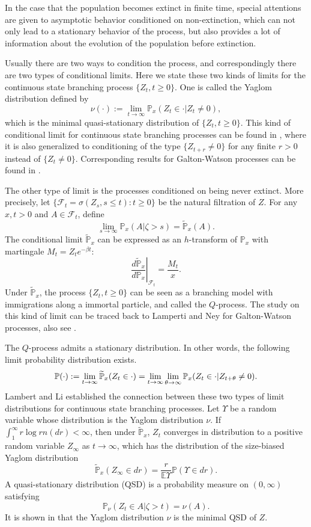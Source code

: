 \documentclass[12pt,a4paper]{amsart}
\numberwithin{equation}{section}
\theoremstyle{plain}
\theoremstyle{definition}
\theoremstyle{remark}
\begin{document}
In the case that the population becomes extinct in finite time, 
special attentions are given to asymptotic behavior conditioned on non-extinction, 
which can not only  lead to a stationary behavior
of the process, but also provides a lot of information about the evolution of the population before extinction.

Usually there are two ways to condition the process, and correspondingly there are two types of conditional limits. Here we state these two kinds of limits for  the continuous state branching process  $\{Z_t, t\geq 0\}$. One is called the Yaglom distribution defined by
\[
\nu(\cdot):=\lim_{t\to\infty} \mathbb P_x(Z_t\in\cdot|Z_{t}\neq 0),
\]
which is the minimal  quasi-stationary distribution of $\{Z_t, t\geq 0\}$. This kind of  conditional limit for continuous state branching processes  can be found in \cite{Li00}, where it is also generalized to conditioning of the type $\{Z_{t+r}\neq 0\}$ for any finite $r>0$ instead of $\{Z_{t}\neq 0\}$. Corresponding results for Galton-Watson processes can be found in \cite{AthreyaNey1972Branching}.

The other type of limit is the processes conditioned on being never extinct. More precisely,  let $\{\mathcal F_t=\sigma(Z_s,s\leq t): t\geq 0\}$ be the natural filtration of $Z$. 
For any $x,t>0$ and $A\in\mathcal F_t$, define
\[
	\lim_{s\rightarrow\infty}\mathbb P_x(A\big|\zeta>s)=\widetilde{\mathbb P}_x(A).
\]
The conditional limit $\widetilde{\mathbb P}_x$  can be expressed as an $h$-transform of $\mathbb P_x$ with martingale $M_t=Z_te^{-\beta t}$:
\[
	\left.\dfrac{d\widetilde{\mathbb P}_x}{d\mathbb P_x}\right|_{\mathcal F_t}=\dfrac{M_t}{x}.
\]
Under $\widetilde{\mathbb P}_x$, the process $\{Z_t, t\geq 0\}$  can be seen as a branching model with immigrations along a immortal particle, and  called the  $Q$-process. The study on this kind of limit can be traced back to Lamperti and Ney \cite{LamandNey} for Galton-Watson processes, also see  \cite{AthreyaNey1972Branching}.

The $Q$-process admits a stationary distribution.  In other words, the following limit probability distribution exists.
\[
\mathbb \mathbb{\mathbb{P}}(\cdot):=\lim_{t\to\infty}\widetilde{\mathbb{P}}_x(Z_t\in \cdot)=\lim_{t\to\infty}\lim_{\theta\to\infty}\mathbb{P}_x(Z_t\in\cdot|Z_{t+\theta}\neq 0).
\]
 Lambert \cite{Lambert2007Quasi-stationary} and Li \cite{Li00} established the connection between these two types of limit distributions for continuous state branching processes.  Let $\Upsilon$ be a random variable whose distribution is the Yaglom distribution $\nu$.  If $\int_1^\infty r\log r n(dr)<\infty$, then under $\widetilde{\mathbb P}_x$, $Z_t$ converges in distribution to a positive
random variable $Z_\infty$ as $t\to\infty$, which has the distribution of the size-biased Yaglom distribution
\[
\widetilde{\mathbb P}_x(Z_\infty\in dr)=\dfrac{r}{\mathbb E\Upsilon}\mathbb P(\Upsilon\in dr).
\]
 A quasi-stationary distribution (QSD) is a probability measure on $(0,\infty)$ satisfying
\[
\mathbb P_{\nu}(Z_t\in A|\zeta>t)=\nu(A).
\]
It is shown in \cite{Lambert2007Quasi-stationary} that the Yaglom distribution $\nu$ is the minimal QSD of $Z$.
\end{document}
